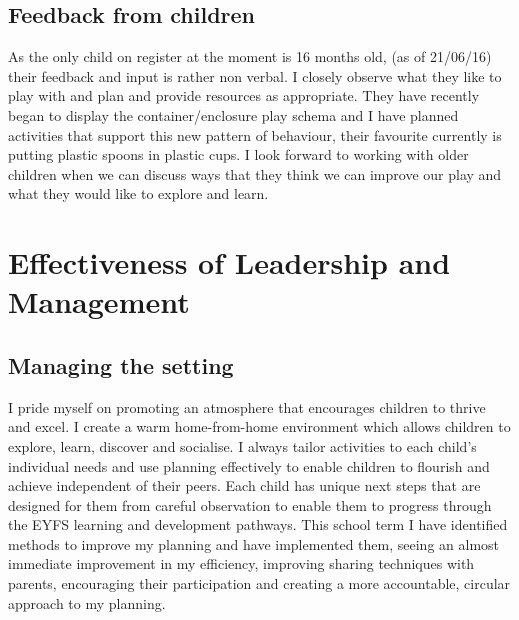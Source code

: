 \documentclass[10pt,a4paper]{report}
\begin{document}
\section{Feedback from children}

As the only child on register at the moment is 16 months old, (as of 21/06/16) their feedback and input is rather non verbal. I closely observe what they like to play with and plan and provide resources as appropriate. They have recently began to display the container/enclosure play schema and I have planned activities that support this new pattern of behaviour, their favourite currently is putting plastic spoons in plastic cups. I look forward to working with older children when we can discuss ways that they think we can improve our play and what they would like to explore and learn. 

\chapter{Effectiveness of Leadership and Management}

\section{Managing the setting}

I pride myself on promoting an atmosphere that encourages children to thrive and excel. I create a warm home-from-home environment which allows children to explore, learn, discover and socialise. I always tailor activities to each child's individual needs and use planning effectively to enable children to flourish and achieve independent of their peers. Each child has unique next steps that are designed for them from careful observation to enable them to progress through the EYFS learning and development pathways. This school term I have identified methods to improve my planning and have implemented them, seeing an almost immediate improvement in my efficiency, improving sharing techniques with parents, encouraging their participation and creating a more accountable, circular approach to my planning. 
\end{document}
